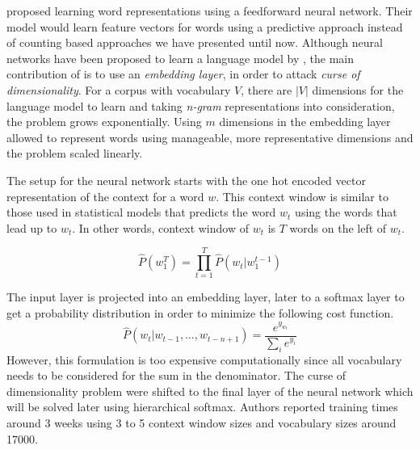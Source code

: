 
\textcite{bengio_neural_2003} proposed learning word representations using a feedforward neural network.
Their model would learn feature vectors for words using a predictive approach instead of counting based approaches we have presented until now.
Although neural networks have been proposed to learn a language model by \textcite{xu_can_2000}, the main contribution of \citeauthor{bengio_neural_2003} is to use an \emph{embedding layer}, in order to attack \emph{curse of dimensionality}.
For a corpus with vocabulary $V$, there are $|V|$ dimensions for the language model to learn and taking \emph{n-gram} representations into consideration, the problem grows exponentially.
Using $m$ dimensions in the embedding layer allowed \citeauthor{bengio_neural_2003} to represent words using manageable, more representative dimensions and the problem scaled linearly.

The setup for the neural network starts with the one hot encoded vector representation of the context for a word $w$.
This context window is similar to those used in statistical models that predicts the word $w_t$ using the words that lead up to $w_t$.
In other words, context window of $w_t$ is $T$ words on the left of $w_t$.

\begin{displaymath}
    \hat{P}(w_1^T) = \prod_{t=1}^{T}\hat{P}(w_t | w_{1}^{t-1})
\end{displaymath}

The input layer is projected into an embedding layer, later to a softmax layer to get a probability distribution in order to minimize the following cost function.
\begin{equation}%
    \label{eqn:bengio_softmax}
    \hat{P}(w_t|w_{t-1}, \dots, w_{t-n+1}) = \frac{e^{y_{w_{t}}}}{\sum_{i}e^{y_{i}}}
\end{equation}
However, this formulation is too expensive computationally since all vocabulary needs to be considered for the sum in the denominator.
The curse of dimensionality problem were shifted to the final layer of the neural network which will be solved later using hierarchical softmax.
Authors reported training times around 3 weeks using 3 to 5 context window sizes and vocabulary sizes around 17000.

